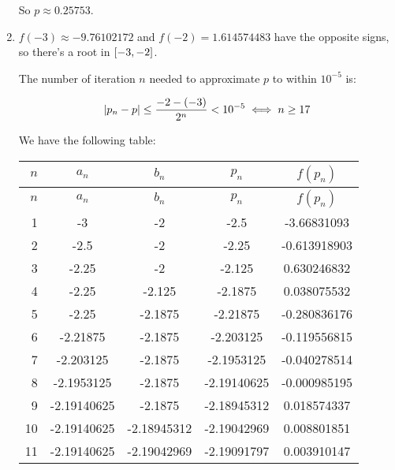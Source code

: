 \documentclass[../../Assignments.tex]{subfiles}
\begin{document}
\begin{solution}
\begin{enumerate}[label = (\alph*)]
            So \(p \approx \num{0.25753}\).

        \item \(f(-3) \approx \num{-9.76102172}\) and \(f(-2) =
            \num{1.614574483}\) have the opposite signs, so there's a root in
            \(\interval{-3}{-2}\).

            The number of iteration \(n\) needed to approximate \(p\) to within
            \(10^{-5}\) is:

            \[\abs{p_n - p} \leq \frac{-2 - (-3)}{2^n} < 10^{-5} \iff n \geq 17\]

            We have the following table:

            \begin{longtable}{r S[table-format=-1.8] S[table-format=-1.8] S[table-format=-1.8] S[table-format=-1.9]}
                \toprule
                \(n\)  &   {\(a_n\)}   &   {\(b_n\)}   &   {\(p_n\)}   &  {\(f(p_n)\)}  \\
                \midrule
                \endfirsthead
                \toprule
                \(n\)  &   {\(a_n\)}   &   {\(b_n\)}   &   {\(p_n\)}   &  {\(f(p_n)\)}  \\
                \midrule
                  &  -3           &  -2           &  -2.5         &  -3.66831093   \\
                    2  &  -2.5         &  -2           &  -2.25        &  -0.613918903  \\
                    3  &  -2.25        &  -2           &  -2.125       &   0.630246832  \\
                    4  &  -2.25        &  -2.125       &  -2.1875      &   0.038075532  \\
                    5  &  -2.25        &  -2.1875      &  -2.21875     &  -0.280836176  \\
                    6  &  -2.21875     &  -2.1875      &  -2.203125    &  -0.119556815  \\
                    7  &  -2.203125    &  -2.1875      &  -2.1953125   &  -0.040278514  \\
                    8  &  -2.1953125   &  -2.1875      &  -2.19140625  &  -0.000985195  \\
                    9  &  -2.19140625  &  -2.1875      &  -2.18945312  &   0.018574337  \\
                   10  &  -2.19140625  &  -2.18945312  &  -2.19042969  &   0.008801851  \\
                   11  &  -2.19140625  &  -2.19042969  &  -2.19091797  &   0.003910147  \\

\end{longtable}
\end{enumerate}
\end{solution}
\end{document}
